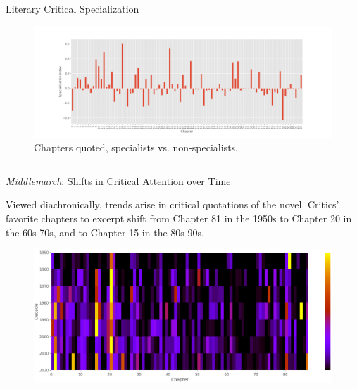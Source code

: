 \documentclass[final]{beamer}
\newlength{\onecolwid}
\newlength{\twocolwid}
\begin{document}
\begin{frame}[t]
\begin{columns}[t]
\begin{column}{\twocolwid}
\begin{columns}[t,totalwidth=\twocolwid]
\begin{column}{\onecolwid}
\begin{block}{Literary Critical Specialization}
\begin{figure}
\includegraphics[width=0.9\linewidth]{specialization.png}
\caption{Chapters quoted, specialists vs. non-specialists.}
\end{figure}


\end{block}


\end{column} %

\end{columns} %


\begin{alertblock}{\emph{Middlemarch}: Shifts in Critical Attention over Time}

Viewed diachronically, trends arise in critical quotations of the novel. Critics' favorite chapters to excerpt shift from Chapter 81 in the 1950s to Chapter 20 in the 60s-70s, and to Chapter 15 in the 80s-90s. 

\begin{figure}
\includegraphics[width=0.8\linewidth]{diachronic.png}
\end{figure}

\end{alertblock} 


\end{column}
\end{columns}
\end{frame}
\end{document}
